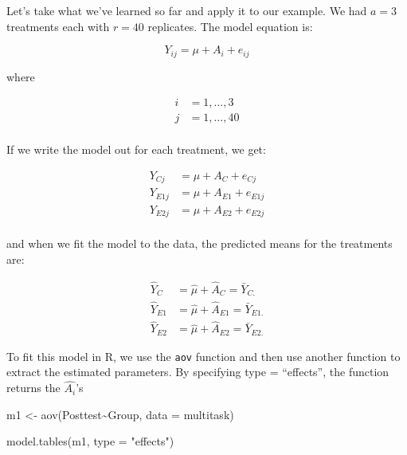 \documentclass[
  letterpaper,
  DIV=11,
  numbers=noendperiod,
  oneside]{scrreprt}
\newenvironment{Shaded}{\begin{snugshade}}{\end{snugshade}}
\newcommand{\AttributeTok}[1]{\textcolor[rgb]{0.40,0.45,0.13}{#1}}
\newcommand{\FunctionTok}[1]{\textcolor[rgb]{0.28,0.35,0.67}{#1}}
\newcommand{\NormalTok}[1]{\textcolor[rgb]{0.00,0.23,0.31}{#1}}
\newcommand{\OtherTok}[1]{\textcolor[rgb]{0.00,0.23,0.31}{#1}}
\newcommand{\SpecialCharTok}[1]{\textcolor[rgb]{0.37,0.37,0.37}{#1}}
\newcommand{\StringTok}[1]{\textcolor[rgb]{0.13,0.47,0.30}{#1}}
\begin{document}
Let's take what we've learned so far and apply it to our example. We had
\(a = 3\) treatments each with \(r=40\) replicates. The model equation
is:

\[ Y_{ij} = \mu + A_{i} + e_{ij}  \]

where

\begin{equation}
\begin{aligned}
i & = 1, \dots, 3  \\
j & = 1, \dots, 40 \\
\end{aligned}
\end{equation}

If we write the model out for each treatment, we get:

\begin{equation}
\begin{aligned}
Y_{Cj} &= \mu + A_C + e_{Cj} \\ 
Y_{E1j} &= \mu + A_{E1} + e_{E1j} \\ 
Y_{E2j} &= \mu + A_{E2} + e_{E2j} \\
\end{aligned}
\end{equation}

and when we fit the model to the data, the predicted means for the
treatments are:

\begin{equation}
\begin{aligned}
\hat{Y}_{C} &= \hat{\mu} + \hat{A}_C = \bar{Y}_{C.}\\ 
\hat{Y}_{E1} &= \hat{\mu} + \hat{A}_{E1} = \bar{Y}_{E1.}\\ 
\hat{Y}_{E2} &= \hat{\mu} + \hat{A}_{E2} = \bar{Y}_{E2.}
\end{aligned}
\end{equation}

To fit this model in R, we use the \texttt{aov} function and then use
another function to extract the estimated parameters. By specifying type
= ``effects'', the function returns the \(\hat{A_i}\)'s

\begin{Shaded}
\begin{Highlighting}[]
\NormalTok{m1 }\OtherTok{\textless{}{-}} \FunctionTok{aov}\NormalTok{(Posttest}\SpecialCharTok{\textasciitilde{}}\NormalTok{Group, }\AttributeTok{data =}\NormalTok{ multitask)}

\FunctionTok{model.tables}\NormalTok{(m1, }\AttributeTok{type =} \StringTok{"effects"}\NormalTok{)}
\end{Highlighting}
\end{Shaded}
\end{document}
